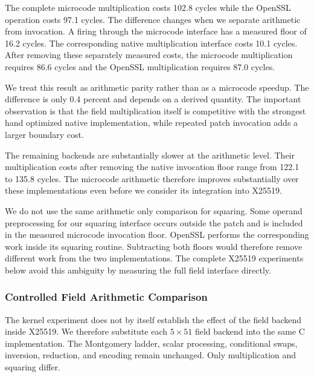 \documentclass[journal=tches,submission]{iacrtrans}
\begin{document}
The complete microcode multiplication costs 102.8 cycles while the OpenSSL operation costs 97.1 cycles.
The difference changes when we separate arithmetic from invocation.
A firing through the microcode interface has a measured floor of 16.2 cycles.
The corresponding native multiplication interface costs 10.1 cycles.
After removing these separately measured costs, the microcode multiplication requires 86.6 cycles and the OpenSSL multiplication requires 87.0 cycles.

We treat this result as arithmetic parity rather than as a microcode speedup.
The difference is only 0.4 percent and depends on a derived quantity.
The important observation is that the field multiplication itself is competitive with the strongest hand optimized native implementation, while repeated patch invocation adds a larger boundary cost.

The remaining backends are substantially slower at the arithmetic level.
Their multiplication costs after removing the native invocation floor range from 122.1 to 135.8 cycles.
The microcode arithmetic therefore improves substantially over these implementations even before we consider its integration into X25519.

We do not use the same arithmetic only comparison for squaring.
Some operand preprocessing for our squaring interface occurs outside the patch and is included in the measured microcode invocation floor.
OpenSSL performs the corresponding work inside its squaring routine.
Subtracting both floors would therefore remove different work from the two implementations.
The complete X25519 experiments below avoid this ambiguity by measuring the full field interface directly.

\subsubsection{Controlled Field Arithmetic Comparison}
\label{sec}

The kernel experiment does not by itself establish the effect of the field backend inside X25519.
We therefore substitute each $5\times51$ field backend into the same C implementation.
The Montgomery ladder, scalar processing, conditional swaps, inversion, reduction, and encoding remain unchanged.
Only multiplication and squaring differ.
\end{document}
